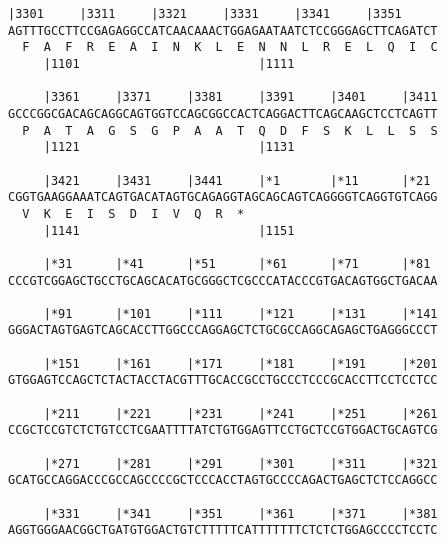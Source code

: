 \documentclass{article}
\begin{document}
\begin{Verbatim}[fontfamily=courier]
     |3301     |3311     |3321     |3331     |3341     |3351
AGTTTGCCTTCCGAGAGGCCATCAACAAACTGGAGAATAATCTCCGGGAGCTTCAGATCT
  F  A  F  R  E  A  I  N  K  L  E  N  N  L  R  E  L  Q  I  C
     |1101                         |1111                    

     |3361     |3371     |3381     |3391     |3401     |3411
GCCCGGCGACAGCAGGCAGTGGTCCAGCGGCCACTCAGGACTTCAGCAAGCTCCTCAGTT
  P  A  T  A  G  S  G  P  A  A  T  Q  D  F  S  K  L  L  S  S
     |1121                         |1131                    

     |3421     |3431     |3441     |*1       |*11      |*21 
CGGTGAAGGAAATCAGTGACATAGTGCAGAGGTAGCAGCAGTCAGGGGTCAGGTGTCAGG
  V  K  E  I  S  D  I  V  Q  R  *   
     |1141                         |1151                    

     |*31      |*41      |*51      |*61      |*71      |*81 
CCCGTCGGAGCTGCCTGCAGCACATGCGGGCTCGCCCATACCCGTGACAGTGGCTGACAA

     |*91      |*101     |*111     |*121     |*131     |*141
GGGACTAGTGAGTCAGCACCTTGGCCCAGGAGCTCTGCGCCAGGCAGAGCTGAGGGCCCT

     |*151     |*161     |*171     |*181     |*191     |*201
GTGGAGTCCAGCTCTACTACCTACGTTTGCACCGCCTGCCCTCCCGCACCTTCCTCCTCC

     |*211     |*221     |*231     |*241     |*251     |*261
CCGCTCCGTCTCTGTCCTCGAATTTTATCTGTGGAGTTCCTGCTCCGTGGACTGCAGTCG

     |*271     |*281     |*291     |*301     |*311     |*321
GCATGCCAGGACCCGCCAGCCCCGCTCCCACCTAGTGCCCCAGACTGAGCTCTCCAGGCC

     |*331     |*341     |*351     |*361     |*371     |*381
AGGTGGGAACGGCTGATGTGGACTGTCTTTTTCATTTTTTTCTCTCTGGAGCCCCTCCTC

\end{Verbatim}
\newpage
\end{document}
